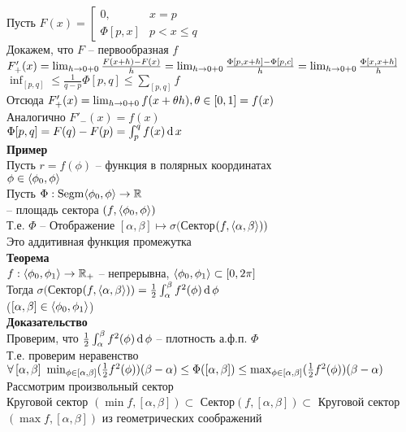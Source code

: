 \documentclass[12pt]{article}
\begin{document}
Пусть $F(x) = \left[\begin{array}{ll}
     0, & x = p \\
     \Phi[p,x] & p < x \leq q
\end{array}\right.$\\
Докажем, что $F$ -- первообразная $f$\\
$F'_+(x) = \lim_{h \rightarrow 0+0} \frac{F(x+h)-F(x)}{h} = \lim_{h \rightarrow 0+0} \frac{\Phi[p, x+h]-\Phi[p,c]}h = \lim_{h\rightarrow 0+0} \frac{\Phi[x, x+h]}{h}$\\
$\inf_{[p,q]} \leq \frac{1}{q-p}\Phi[p,q] \leq \sum_{[p,q]} f$\\
Отсюда $F'_+(x) = \lim_{h\rightarrow 0+0} f(x+\theta h), \theta \in [0,1] = f(x)$\\
Аналогично $F'_-(x) = f(x)$\\
$\Phi[p,q] = F(q)-F(p) = \int_p^q f(x)\operatorname{d} x$\\
\textbf{Пример}\\
Пусть $r = f(\phi)$ -- функция в полярных координатах\\
$\phi \in \langle \phi_0, \phi \rangle$\\
Пусть $\Phi: \operatorname{Segm}\langle \phi_0, \phi \rangle \rightarrow \mathbb{R}$\\ -- площадь сектора $(f, \langle \phi_0, \phi \rangle)$\\
Т.е. $\Phi$ -- Отображение $[\alpha, \beta] \mapsto \sigma($Сектор$(f, \langle \alpha, \beta \rangle))$\\
Это аддитивная функция промежутка\\
\textbf{Теорема}\\
$f: \langle \phi_0, \phi_1 \rangle \rightarrow \mathbb{R}_+$ -- непрерывна, $\langle \phi_0, \phi_1 \rangle \subset [0, 2\pi]$\\
Тогда $\sigma($Сектор$(f, \langle \alpha, \beta \rangle)) = \frac12 \int_\alpha^\beta f^2(\phi)\operatorname{d} \phi$\\
($[\alpha, \beta] \in \langle \phi_0, \phi_1 \rangle$)\\
\textbf{Доказательство}\\
Проверим, что $\frac12 \int_\alpha^\beta f^2(\phi)\operatorname{d} \phi$ -- плотность а.ф.п. $\Phi$\\
Т.е. проверим неравенство $\forall\, [\alpha, \beta]\ \min_{\phi \in [\alpha, \beta]}(\frac12 f^2(\phi))(\beta - \alpha) \leq \Phi([\alpha, \beta]) \leq \max_{\phi \in [\alpha, \beta]}(\frac12 f^2(\phi))(\beta - \alpha)$\\
Рассмотрим произвольный сектор\\
Круговой сектор $(\min f, [\alpha, \beta])\subset $ Сектор$(f, [\alpha, \beta])\subset$ Круговой сектор $(\max f, [\alpha, \beta])$ из геометрических соображений\\
\end{document}
